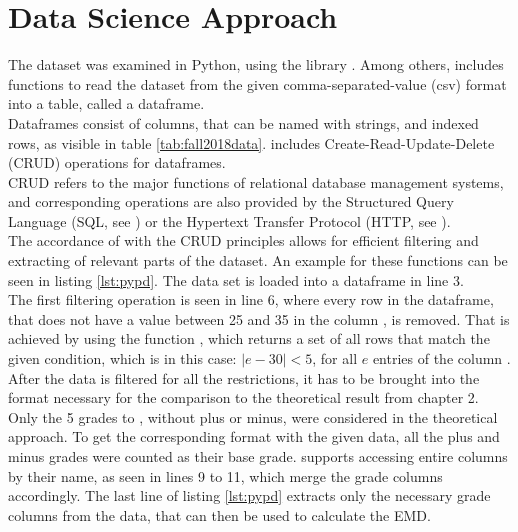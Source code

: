 \documentclass[12pt,letterpaper,oneside,openany]{book}
\begin{document}
\chapter{Data Science Approach}
The dataset was examined in Python, using the library . Among others,  includes functions to read the dataset from the given comma-separated-value (csv) format into a table, called a dataframe. \\
Dataframes  consist of  columns, that can be named with strings,  and indexed rows, as visible in table \ref{tab:fall2018data}.  includes Create-Read-Update-Delete (CRUD) operations for dataframes. \\
CRUD refers to the major functions of relational database management systems, and corresponding operations are also provided by the Structured Query Language (SQL, see \cite{date1993iso}) or the Hypertext Transfer Protocol (HTTP, see \cite{fielding1999hypertext}).\\
The accordance of  with the CRUD principles allows for efficient filtering and extracting of  relevant parts of the dataset. 
An example for these functions can be seen in listing \ref{lst:pypd}. The data set is loaded into a dataframe in line 3. \\
The first filtering operation is seen in line 6, where every row in the dataframe, that does not have a value between 25 and 35 in the column , is removed. That is achieved by using the function , which returns a set of all rows that match the given condition, which is in this case: $|e - 30| < 5$, for all $e$ entries of the column .
After the data is filtered for all the restrictions, it has to be brought into the format necessary for the comparison to the theoretical result from chapter 2. Only the 5 grades  to , without plus or minus, were considered in the theoretical approach. To get the corresponding format with the given data, all the plus and minus grades were counted as their base grade.  supports accessing entire columns by their name, as seen in lines 9 to 11, which merge the grade columns accordingly. 
The last line of listing \ref{lst:pypd} extracts only the necessary grade columns from the data, that can then be used to calculate the EMD.
\end{document}
